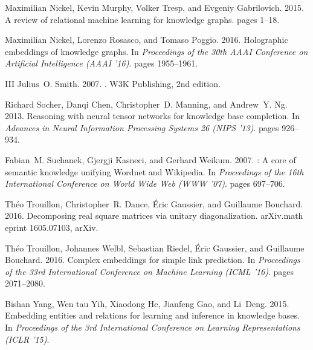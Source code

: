 \documentclass[11pt,a4paper]{article}
\begin{document}
\begin{thebibliography}{}
Maximilian Nickel, Kevin Murphy, Volker Tresp, and Evgeniy Gabrilovich. 2015.
\newblock A review of relational machine learning for knowledge graphs.
 pages 1--18.

Maximilian Nickel, Lorenzo Rosasco, and Tomaso Poggio. 2016.
\newblock Holographic embeddings of knowledge graphs.
\newblock In {\em Proceedings of the 30th AAAI Conference on Artificial
  Intelligence (AAAI '16)\/}. pages 1955--1961.

III Julius~O. Smith. 2007.
.
\newblock W3K Publishing, 2nd edition.

Richard Socher, Danqi Chen, Christopher~D. Manning, and Andrew~Y. Ng. 2013.
\newblock Reasoning with neural tensor networks for knowledge base completion.
\newblock In {\em Advances in Neural Information Processing Systems 26 (NIPS
  '13)\/}. pages 926--934.

Fabian~M. Suchanek, Gjergji Kasneci, and Gerhard Weikum. 2007.
: A core of semantic knowledge unifying {W}ordnet and
  {W}ikipedia.
\newblock In {\em Proceedings of the 16th International Conference on World
  Wide Web (WWW '07)\/}. pages 697--706.

Th{\'{e}}o Trouillon, Christopher~R. Dance, {\'{E}}ric Gaussier, and Guillaume
  Bouchard. 2016{}.
\newblock Decomposing real square matrices via unitary diagonalization.
\newblock arXiv.math eprint 1605.07103, arXiv.

Th{\'{e}}o Trouillon, Johannes Welbl, Sebastian Riedel, {\'{E}}ric Gaussier,
  and Guillaume Bouchard. 2016{}.
\newblock Complex embeddings for simple link prediction.
\newblock In {\em Proceedings of the 33rd International Conference on Machine
  Learning (ICML '16)\/}. pages 2071--2080.

Bishan Yang, Wen tau Yih, Xiaodong He, Jianfeng Gao, and Li~Deng. 2015.
\newblock Embedding entities and relations for learning and inference in
  knowledge bases.
\newblock In {\em Proceedings of the 3rd International Conference on Learning
  Representations (ICLR '15)\/}.

\end{thebibliography}
\end{document}
